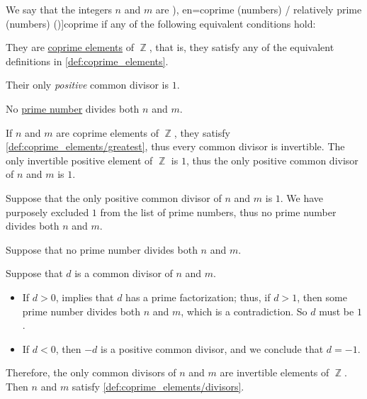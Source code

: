 \begin{definition}\label{def:coprime_numbers}
  We say that the integers \( n \) and \( m \) are \term[ru=взаимно простые (числа) (\cite[45]{Зорич2019АнализЧасть1}), en=coprime (numbers) / relatively prime (numbers) (\cite[107]{GowersEtAl2008PrincetonCompanion})]{coprime} if any of the following equivalent conditions hold:
  \begin{thmenum}
    \mimprovised They are \hyperref[def:coprime_elements]{coprime elements} of \( \BbbZ \), that is, they satisfy any of the equivalent definitions in \cref{def:coprime_elements}.

     Their only \emph{positive} common divisor is \( 1 \).

    \mimprovised No \hyperref[def:prime_number]{prime number} divides both \( n \) and \( m \).
  \end{thmenum}
\end{definition}
\begin{defproof}
   If \( n \) and \( m \) are coprime elements of \( \BbbZ \), they satisfy \cref{def:coprime_elements/greatest}, thus every common divisor is invertible. The only invertible positive element of \( \BbbZ \) is \( 1 \), thus the only positive common divisor of \( n \) and \( m \) is \( 1 \).

   Suppose that the only positive common divisor of \( n \) and \( m \) is \( 1 \). We have purposely excluded \( 1 \) from the list of prime numbers, thus no prime number divides both \( n \) and \( m \).

   Suppose that no prime number divides both \( n \) and \( m \).

  Suppose that \( d \) is a common divisor of \( n \) and \( m \).

  \begin{itemize}
    \item If \( d > 0 \),  implies that \( d \) has a prime factorization; thus, if \( d > 1 \), then some prime number divides both \( n \) and \( m \), which is a contradiction. So \( d \) must be \( 1 \).

    \item If \( d < 0 \), then \( -d \) is a positive common divisor, and we conclude that \( d = -1 \).
  \end{itemize}

  Therefore, the only common divisors of \( n \) and \( m \) are invertible elements of \( \BbbZ \). Then \( n \) and \( m \) satisfy \cref{def:coprime_elements/divisors}.
\end{defproof}

